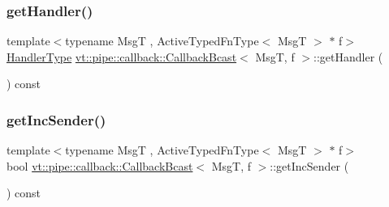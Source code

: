 \subsubsection{\texorpdfstring{get\+Handler()}{getHandler()}}
{\footnotesize\ttfamily template$<$typename MsgT , Active\+Typed\+Fn\+Type$<$ Msg\+T $>$ $\ast$ f$>$ \\
\hyperlink{namespacevt_af64846b57dfcaf104da3ef6967917573}{Handler\+Type} \hyperlink{structvt_1_1pipe_1_1callback_1_1_callback_bcast}{vt\+::pipe\+::callback\+::\+Callback\+Bcast}$<$ MsgT, f $>$\+::get\+Handler (\begin{DoxyParamCaption}{ }\end{DoxyParamCaption}) const\hspace{0.3cm}{\ttfamily [inline]}}

\mbox{\label{structvt_1_1pipe_1_1callback_1_1_callback_bcast_a44fca909dc3216da6c84a6277649fa6e}} 
\subsubsection{\texorpdfstring{get\+Inc\+Sender()}{getIncSender()}}
{\footnotesize\ttfamily template$<$typename MsgT , Active\+Typed\+Fn\+Type$<$ Msg\+T $>$ $\ast$ f$>$ \\
bool \hyperlink{structvt_1_1pipe_1_1callback_1_1_callback_bcast}{vt\+::pipe\+::callback\+::\+Callback\+Bcast}$<$ MsgT, f $>$\+::get\+Inc\+Sender (\begin{DoxyParamCaption}{ }\end{DoxyParamCaption}) const\hspace{0.3cm}{\ttfamily [inline]}}

\mbox{\label{structvt_1_1pipe_1_1callback_1_1_callback_bcast_a2337a0d2bda968f7ab1e4c85c3dbe67a}} 
